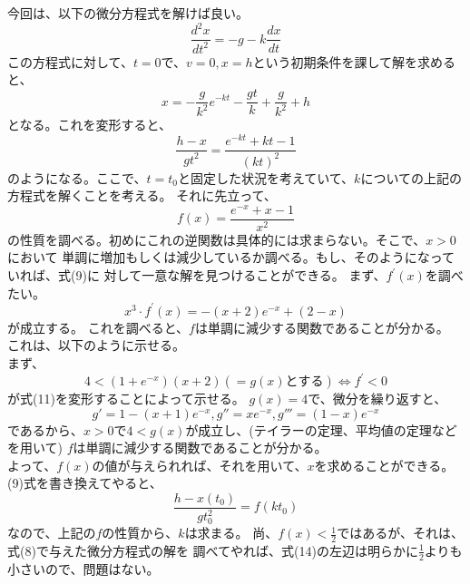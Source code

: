 \documentclass{jarticle}
\begin{document}
\subsection{}
今回は、以下の微分方程式を解けば良い。
\begin{equation}
\frac{d^2 x}{dt^2} = -g - k\frac{dx}{dt}
\end{equation}
この方程式に対して、$t=0$で、$v=0,x=h$という初期条件を課して解を求めると、
\begin{equation}
x = -\frac{g}{k^2}e^{-kt} - \frac{gt}{k} + \frac{g}{k^2} + h
\end{equation}
となる。これを変形すると、
\begin{equation}
\frac{h-x}{gt^2} = \frac{e^{-kt} + kt -1}{(kt)^2}
\end{equation}
のようになる。ここで、$t=t_0$と固定した状況を考えていて、$k$についての上記の
方程式を解くことを考える。
それに先立って、
\begin{equation}
f(x) = \frac{e^{-x} + x -1}{x^2}
\end{equation}
の性質を調べる。初めにこれの逆関数は具体的には求まらない。そこで、$x>0$において
単調に増加もしくは減少しているか調べる。もし、そのようになっていれば、式(9)に
対して一意な解を見つけることができる。
まず、$f^{\prime}(x)$を調べたい。
\begin{equation}
x^3\cdot f^{\prime} (x) = -(x+2)e^{-x} + (2-x)
\end{equation}
が成立する。
これを調べると、$f$は単調に減少する関数であることが分かる。
これは、以下のように示せる。
\\
まず、
\begin{equation}
4 < (1 + e^{-x})(x+2)(=g(x)とする) \Leftrightarrow f^{\prime} < 0
\end{equation}
が式(11)を変形することによって示せる。
$g(x) =4$で、微分を繰り返すと、
\begin{equation}
g' = 1-(x+1)e^{-x},g'' = xe^{-x},g''' = (1-x)e^{-x}
\end{equation}
であるから、$x>0$で$4<g(x)$が成立し、(テイラーの定理、平均値の定理などを用いて)
$f$は単調に減少する関数であることが分かる。
\\
よって、$f(x)$の値が与えられれば、それを用いて、$x$を求めることができる。
(9)式を書き換えてやると、
\begin{equation}
\frac{h-x(t_0)}{gt_0^2} = f(kt_0)
\end{equation}
なので、上記の$f$の性質から、$k$は求まる。
尚、$f(x) < \frac{1}{2}$ではあるが、それは、式(8)で与えた微分方程式の解を
調べてやれば、式(14)の左辺は明らかに$\frac{1}{2}$よりも小さいので、問題はない。
\end{document}
